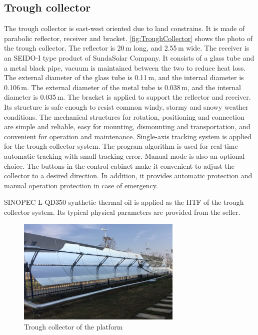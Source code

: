 \subsection{Trough collector}
The trough collector is east-west oriented due to land constrains. It is made of parabolic reflector, receiver and bracket. \autoref{fig:TroughCollector} shows the photo of the trough collector. The reflector is 20$\,\mathrm{m}$ long, and 2.55$\,\mathrm{m}$ wide. The receiver is an SEIDO-I type product of SundaSolar Company. It consists of a glass tube and a metal black pipe, vacuum is maintained between the two to reduce heat loss. 
The external diameter of the glass tube is 0.11$\,\mathrm{m}$, and the internal diameter is 0.106$\,\mathrm{m}$.
The external diameter of the metal tube is 0.038$\,\mathrm{m}$, and the internal diameter is 0.035$\,\mathrm{m}$.
The bracket is applied to support the reflector and receiver. Its structure is safe enough to resist common windy, stormy and snowy weather conditions. The mechanical structures for rotation, positioning and connection are simple and reliable, easy for mounting, dismounting and transportation, and convenient for operation and maintenance.
Single-axis tracking system is applied for the trough collector system. The program algorithm is used for real-time automatic tracking with small tracking error. Manual mode is also an optional choice. The buttons in the control cabinet make it convenient to adjust the collector to a desired direction. In addition, it provides automatic protection and manual operation protection in case of emergency.

SINOPEC L-QD350 synthetic thermal oil is applied as the HTF of the trough collector system. Its typical physical parameters are provided from the seller.

\begin{figure}[!ht]
\centering
\includegraphics[width=0.7\textwidth]{fig/TroughCollector.jpg}
\caption{Trough collector of the platform}\label{fig:TroughCollector}
\end{figure}

